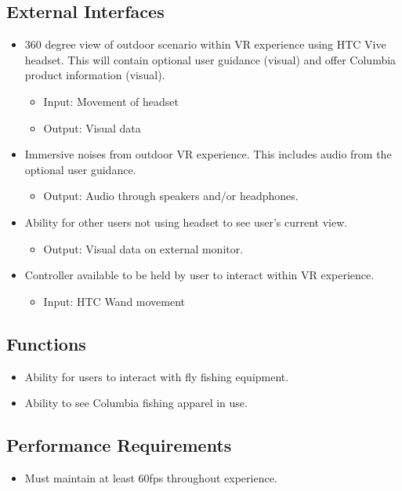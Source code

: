 \documentclass[10pt,journal,compsoc,onecolumn, draftclsnofoot]{IEEEtran}
\begin{document}
\subsection{External Interfaces}
\begin{itemize}
  \item 360 degree view of outdoor scenario within VR experience using HTC Vive
  headset. This will contain optional user guidance (visual) and offer Columbia
  product information (visual).
    \begin{itemize}
      \item Input: Movement of headset
      \item Output: Visual data
    \end{itemize}
  \item Immersive noises from outdoor VR experience. This includes audio from
  the optional user guidance.
    \begin{itemize}
      \item Output: Audio through speakers and/or headphones.
    \end{itemize}
  \item Ability for other users not using headset to see user's current view.
    \begin{itemize}
      \item Output: Visual data on external monitor.
    \end{itemize}
  \item Controller available to be held by user to interact within VR experience.
    \begin{itemize}
      \item Input: HTC Wand movement
    \end{itemize}
\end{itemize}

\subsection{Functions}
\begin{itemize}
  \item Ability for users to interact with fly fishing equipment.
  \item Ability to see Columbia fishing apparel in use.
\end{itemize}

\subsection{Performance Requirements}
\begin{itemize}
  \item Must maintain at least 60fps throughout experience.\cite{hall_2016}
\end{itemize}
\end{document}
